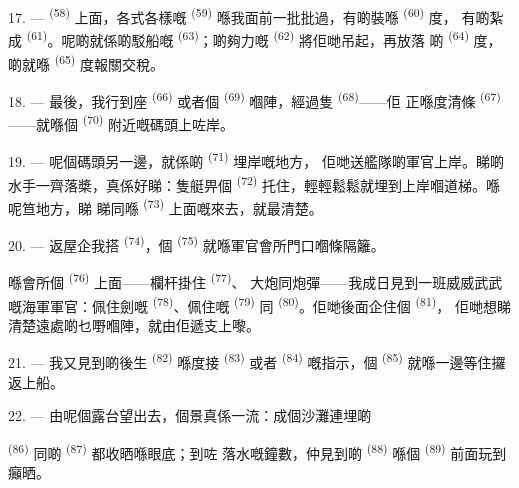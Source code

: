 17. ---  \textsuperscript{(58)} 上面，各式各樣嘅
\textsuperscript{(59)} 喺我面前一批批過，有啲裝喺 \textsuperscript{(60)} 度，
有啲紮成 \textsuperscript{(61)}。呢啲就係啲駁船嘅
\textsuperscript{(63)}；啲夠力嘅 \textsuperscript{(62)} 將佢哋吊起，再放落
啲 \textsuperscript{(64)} 度，啲就喺
\textsuperscript{(65)} 度報關交稅。

18. --- 最後，我行到座 \textsuperscript{(66)} 或者個
\textsuperscript{(69)} 嗰陣，經過隻 \textsuperscript{(68)}——佢
正喺度清條 \textsuperscript{(67)}——就喺個
\textsuperscript{(70)} 附近嘅碼頭上咗岸。

19. --- 呢個碼頭另一邊，就係啲 \textsuperscript{(71)} 埋岸嘅地方，
佢哋送艦隊啲軍官上岸。睇啲水手一齊落槳，真係好睇：隻艇畀個
\textsuperscript{(72)} 托住，輕輕鬆鬆就埋到上岸嗰道梯。喺呢笪地方，睇
睇同喺 \textsuperscript{(73)} 上面嘅來去，就最清楚。

\VUsaut{3.0mm}
\VUsaut{3.0mm}

20. --- 返屋企我搭 \textsuperscript{(74)}，個
\textsuperscript{(75)} 就喺軍官會所門口嗰條隔籬。

喺會所個 \textsuperscript{(76)} 上面——欄杆掛住 \textsuperscript{(77)}、
大炮同炮彈——我成日見到一班威威武武嘅海軍軍官：佩住劍嘅
\textsuperscript{(78)}、佩住嘅 \textsuperscript{(79)} 同
 \textsuperscript{(80)}。佢哋後面企住個 \textsuperscript{(81)}，
佢哋想睇清楚遠處啲乜嘢嗰陣，就由佢遞支上嚟。

21. --- 我又見到啲後生 \textsuperscript{(82)} 喺度接
\textsuperscript{(83)} 或者 \textsuperscript{(84)} 嘅指示，個
\textsuperscript{(85)} 就喺一邊等住攞返上船。

22. --- 由呢個露台望出去，個景真係一流：成個沙灘連埋啲

\textsuperscript{(86)} 同啲 \textsuperscript{(87)} 都收晒喺眼底；到咗
落水嘅鐘數，仲見到啲 \textsuperscript{(88)} 喺個
\textsuperscript{(89)} 前面玩到癲晒。


